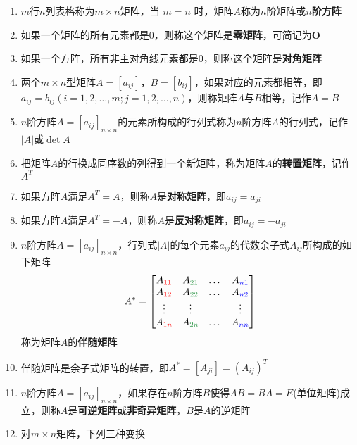 \documentclass[a4paper,12pt]{article}
\begin{document}
    \begin{enumerate}
        \item $m$行$n$列表格称为$m \times n$矩阵，当 $m = n$ 时，矩阵$A$称为$n$阶矩阵或\textbf{$n$阶方阵}
        \item 如果一个矩阵的所有元素都是$0$，则称这个矩阵是\textbf{零矩阵}，可简记为$\mathbf{O}$
        \item 如果一个方阵，所有非主对角线元素都是0，则称这个矩阵是\textbf{对角矩阵}
        \item 两个$m \times n$型矩阵$A = [a_{ij}]$，$B = [b_{ij}]$，如果对应的元素都相等，即$a_{ij} = b_{ij}(i = 1,2,\dots,m; j = 1,2,\dots,n)$，则称矩阵$A$与$B$相等，记作$A = B$
        \item $n$阶方阵$A = [a_{ij}]_{n \times n}$的元素所构成的行列式称为$n$阶方阵$A$的行列式，记作$|A|$或$\det A$
        \item 把矩阵$A$的行换成同序数的列得到一个新矩阵，称为矩阵$A$的\textbf{转置矩阵}，记作$A^T$
        \item 如果方阵$A$满足$A^T = A$，则称$A$是\textbf{对称矩阵}，即$a_{ij} = a_{ji}$
        \item 如果方阵$A$满足$A^T = -A$，则称$A$是\textbf{反对称矩阵}，即$a_{ij} = -a_{ji}$
        \item $n$阶方阵$A = [a_{ij}]_{n \times n}$，行列式$|A|$的每个元素$a_{ij}$的代数余子式$A_{ij}$所构成的如下矩阵
        \[
            A^* =
            \begin{bmatrix}
                A_{\color{red}{11}} & A_{\textcolor[rgb]{0.2, 0.6, 0.3}{21}} & \dots & A_{\textcolor{blue}{n1}} \\
                A_{\color{red}{12}} & A_{\textcolor[rgb]{0.2, 0.6, 0.3}{22}} & \dots & A_{\textcolor{blue}{n2}} \\
                \vdots              & \vdots                                 &       & \vdots                   \\
                A_{\color{red}{1n}} & A_{\textcolor[rgb]{0.2, 0.6, 0.3}{2n}} & \dots & A_{\textcolor{blue}{nn}}
            \end{bmatrix}
        \]
        称为矩阵$A$的\textbf{伴随矩阵}
        \item 伴随矩阵是余子式矩阵的转置，即$A^* = [A_{ji}] = (A_{ij})^T$
        \item $n$阶方阵$A = [a_{ij}]_{n \times n}$，如果存在$n$阶方阵$B$使得$AB = BA = E$(单位矩阵)成立，则称$A$是\textbf{可逆矩阵}或\textbf{非奇异矩阵}，$B$是$A$的逆矩阵
        \item 对$m \times n$矩阵，下列三种变换

\end{enumerate}
\end{document}
